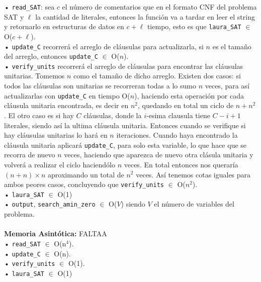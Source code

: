 \documentclass[letterpaper,12pt]{article}
\begin{document}
• \texttt{read\_SAT}: sea $c$ el número de comentarios que en el formato CNF del problema SAT y $\ell$ la cantidad de literales, entonces la función va a tardar en leer el string y retornarlo en estructuras de datos en $c + \ell$ tiempo, esto es que \texttt{laura\_SAT} $\in$ O($c + \ell$).\\

• \texttt{update\_C} recorrerá el arreglo de cláusulas para actualizarla, si $n$ es el tamaño del arreglo, entonces \texttt{update\_C} $\in$ O($n$).\\

• \texttt{verify\_units} recorrerá el arreglo de cláusulas para encontrar las cláusulas unitarias. Tomemos $n$ como el tamaño de dicho arreglo. Existen dos casos: si todos las cláusulas son unitarias se recorreran todas a lo sumo $n$ veces, para así actualizarlas con \texttt{update\_C} en tiempo O($n$), haciendo esta operación por cada cláusula unitaria encontrada, es decir en $n^2$, quedando en total un ciclo de $n + n^2$. El otro caso es si hay $C$ cláusulas, donde la $i$-esima clausula tiene $C-i+1$ literales, siendo así la ultima cláusula unitaria. Entonces cuando se verifique si hay cláusulas unitarias lo hará en $n$ iteraciones. Cuando haya encontrado la cláusula unitaria aplicará \texttt{update\_C}, para solo esta variable, lo que hace que se recorra de nuevo $n$ veces, haciendo que aparezca de nuevo otra clásula unitaria y volverá a realizar el ciclo haciendólo $n$ veces. En total entonces nos queraría $(n + n)\times n$ aproximando un total de $n^2$ veces. Así tenemos cotas iguales para ambos peores casos, concluyendo que \texttt{verify\_units} $\in$ O($n^2$).\\

• \texttt{laura\_SAT} $\in$ O(1)\\

• \texttt{output}, \texttt{search\_amin\_zero} $\in$ O($V$) siendo $V$ el número de variables del problema.\\
\\
\textbf{Memoria Asintótica:} FALTAA\\ 

• \texttt{read\_SAT} $\in$ O(n$^4$).\\

• \texttt{update\_C} $\in$ O(n).\\

• \texttt{verify\_units} $\in$ O(1).\\

• \texttt{laura\_SAT} $\in$ O(1)\\
\end{document}

